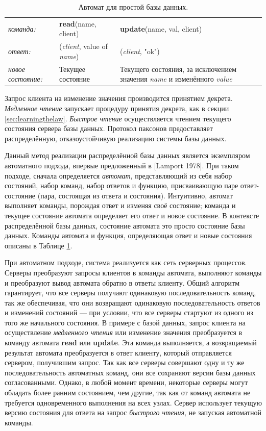 \documentclass[12pt, a4paper]{article} %
\begin{document}
\begin{table}[h]
\begin{tabular}{lp{4cm}p{3.6cm}}
    \textit{команда:}&\textbf{read}(name, client)&\textbf{update}(name, val, client)\\
    \textit{ответ:}&(\textit{client}, value of \textit{name})&(\textit{client}, "ok")\\
    \textit{новое состояние:}&Текущее состояние&Текущего состояния, за исключением значения \textit{name} и изменённого \textit{value}\\
\end{tabular}
\caption{Автомат для простой базы данных.}
\label{table:1}
\end{table}
Запрос клиента на изменение значения производится принятием декрета. \textit{Медленное чтение} запускает процедуру принятия декрета, как в секции \ref{sec:learningthelaw}. \textit{Быстрое чтение} осуществляется чтением текущего состояния сервера базы данных. Протокол паксонов предоставляет распределённую, отказоустойчивую реализацию системы базы данных.

Данный метод реализации распределённой базы данных является экземпляром автоматного подхода, впервые предложенный в [Lamport 1978]. При таком подходе, сначала определяется \textit{автомат}, представляющий из себя набор состояний, набор команд, набор ответов и функцию, присваивающую паре ответ-состояние (пара, состоящая из ответа и состояния). Интуитивно, автомат выполняет команды, порождая ответ и изменяя своё состояние; команда и текущее состояние автомата определяет его ответ и новое состояние. В контексте распределённой базы данных, состояние автомата это просто состояние базы данных. Команды автомата и функция, определяющая ответ и новые состояния описаны в Таблице \ref{table:1}.

При автоматном подходе, система реализуется как сеть серверных процессов. Серверы преобразуют запросы клиентов в команды автомата, выполняют команды и преобразуют вывод автомата обратно в ответы клиенту. Общий алгоритм гарантирует, что все серверы получают одинаковую последовательность команд, так же обеспечивая, что они возвращают одинаковую последовательность ответов и изменений состояний --- при условии, что все серверы стартуют из одного из того же начального состояния. В примере с базой данных, запрос клиента на осуществление \textit{медленного чтения} или изменение значения преобразуется в команду автомата \textbf{read} или \textbf{update}. Эта команда выполняется, а возвращаемый результат автомата преобразуется в ответ клиенту, который отправляется сервером, получившим запрос. Так как все серверы совершают одну и ту же последовательность автоматных команд, они все сохраняют версии базы данных согласованными. Однако, в любой момент времени, некоторые серверы могут обладать более ранним состоянием, чем другие, так как от команд автомата не требуется одновременного выполнения на всех узлах. Сервер использует текущую версию состояния для ответа на запрос \textit{быстрого чтения}, не запуская автоматной команды.
\end{document}
